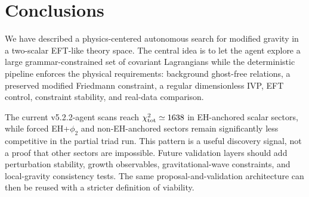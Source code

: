 \documentclass[aps,prd,twocolumn,superscriptaddress,nofootinbib,longbibliography]{revtex4-2}
\newcommand{\chiT}{\chi^2_{\rm tot}}
\begin{document}
\section{Conclusions}
\label{sec:conclusions}

We have described a physics-centered autonomous search for modified gravity in a two-scalar EFT-like theory space.  The central idea is to let the agent explore a large grammar-constrained set of covariant Lagrangians while the deterministic pipeline enforces the physical requirements: background ghost-free relations, a preserved modified Friedmann constraint, a regular dimensionless IVP, EFT control, constraint stability, and real-data comparison.

The current v5.2.2-agent scans reach $\chiT\simeq1638$ in EH-anchored scalar sectors, while forced EH+$\phi_2$ and non-EH-anchored sectors remain significantly less competitive in the partial triad run.  This pattern is a useful discovery signal, not a proof that other sectors are impossible.  Future validation layers should add perturbation stability, growth observables, gravitational-wave constraints, and local-gravity consistency tests.  The same proposal-and-validation architecture can then be reused with a stricter definition of viability.




\end{document}
